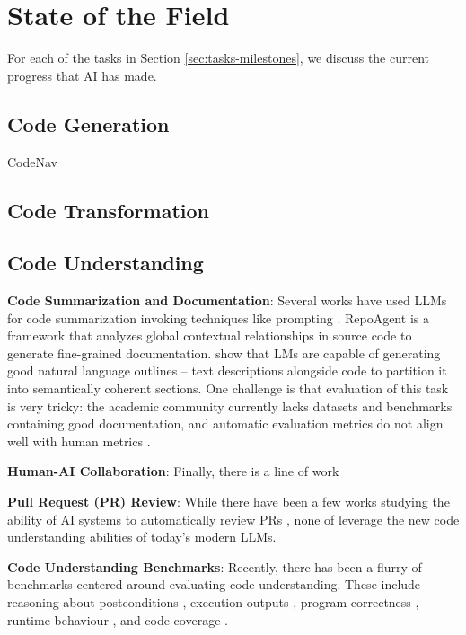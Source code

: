

\section{State of the Field}
For each of the tasks in Section \ref{sec:tasks-milestones}, we discuss the current progress that AI has made. 

\subsection{Code Generation}

CodeNav \citep{gupta2024codenav}

\subsection{Code Transformation}


\subsection{Code Understanding}


\textbf{Code Summarization and Documentation}: Several works have used LLMs for code summarization invoking techniques like prompting \citep{sun2024source, su2024distilled, haldar2024analyzing, ahmed2024automatic}. RepoAgent \citep{luo2024repoagent} is a framework that analyzes global contextual relationships in source code to generate fine-grained documentation. \citet{shi2024natural} show that LMs are capable of generating good natural language outlines -- text descriptions alongside code to partition it into semantically coherent sections. One challenge is that evaluation of this task is very tricky: the academic community currently lacks datasets and benchmarks containing good documentation, and automatic evaluation metrics do not align well with human metrics \citep{diggs2024leveraging}. 



\textbf{Human-AI Collaboration}: Finally, there is a line of work  \citep{nam2024using, yan2024ivie}

\textbf{Pull Request (PR) Review}: While there have been a few works studying the ability of AI systems to automatically review PRs \citep{tufano2021towards, tufano2022using, li2022automating, li2024utilizing}, none of leverage the new code understanding abilities of today's modern LLMs.

\textbf{Code Understanding Benchmarks}: Recently, there has been a flurry of benchmarks centered around evaluating code understanding. These include reasoning about postconditions \citep{he2024beyond}, execution outputs \citep{gu2024cruxeval}, program correctness \citep{gu2024counterfeit}, runtime behaviour \citep{chen2024evaluating}, and code coverage \citep{dhulipala2024planning}.

